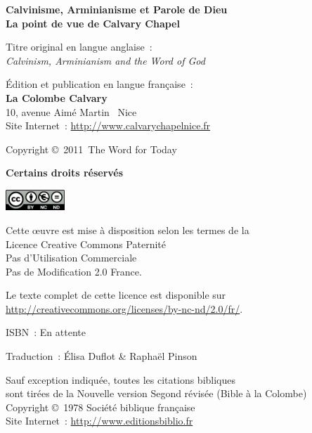 \newpage
\mbox{}
\vfill

{\scriptsize

{\bfseries Calvinisme, Arminianisme et Parole de Dieu\\
La point de vue de Calvary Chapel}

Titre original en langue anglaise~:\\
\emph{Calvinism, Arminianism and the Word of God}

Édition et publication en langue française~:\\
{\bfseries La Colombe Calvary}\\
10, avenue Aimé Martin ~Nice\\
Site Internet~: \url{http://www.calvarychapelnice.fr}

Copyright \copyright{}~2011~The Word for Today

{\bfseries Certains droits réservés}

\includegraphics[width=6em]{by-nc-nd_eu}

Cette \oe{}uvre est mise à disposition selon les termes de la \\
 Licence Creative Commons Paternité \\
 \ocadr Pas d'Utilisation Commerciale \\
 \ocadr Pas de Modification 2.0 France.

Le texte complet de cette licence est disponible sur \\
 \url{http://creativecommons.org/licenses/by-nc-nd/2.0/fr/}.

ISBN~: En attente

Traduction~: Élisa Duflot \& Raphaël Pinson

Sauf exception indiquée, toutes les citations bibliques \\
 sont tirées de la Nouvelle version Segond révisée (Bible à la Colombe) \\
 Copyright \copyright{}~1978 Société biblique française \\
Site Internet~: \url{http://www.editionsbiblio.fr}

}
\enlargethispage{\footskip}
